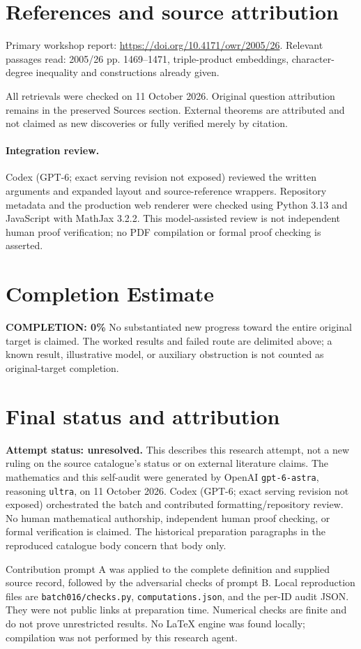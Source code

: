\documentclass[11pt]{article}
\begin{document}
\section{References and source attribution}
Primary workshop report: \url{https://doi.org/10.4171/owr/2005/26}. Relevant passages read: 2005/26 pp. 1469--1471, triple-product embeddings, character-degree inequality and constructions already given.

All retrievals were checked on 11 October 2026. Original question attribution remains in the preserved Sources section. External theorems are attributed and not claimed as new discoveries or fully verified merely by citation.


\paragraph{Integration review.} Codex (GPT-6; exact serving revision not exposed) reviewed the written arguments and expanded layout and source-reference wrappers. Repository metadata and the production web renderer were checked using Python 3.13 and JavaScript with MathJax 3.2.2. This model-assisted review is not independent human proof verification; no PDF compilation or formal proof checking is asserted.

\section{Completion Estimate}
\noindent\textbf{COMPLETION: 0\%}
No substantiated new progress toward the entire original target is claimed. The worked results and failed route are delimited above; a known result, illustrative model, or auxiliary obstruction is not counted as original-target completion.

\section{Final status and attribution}
\textbf{Attempt status: unresolved.} This describes this research attempt, not a new ruling on the source catalogue's status or on external literature claims.
The mathematics and this self-audit were generated by OpenAI \texttt{gpt-6-astra}, reasoning \texttt{ultra}, on 11 October 2026. Codex (GPT-6; exact serving revision not exposed) orchestrated the batch and contributed formatting/repository review. No human mathematical authorship, independent human proof checking, or formal verification is claimed. The historical preparation paragraphs in the reproduced catalogue body concern that body only.

Contribution prompt A was applied to the complete definition and supplied source record, followed by the adversarial checks of prompt B. Local reproduction files are \texttt{batch016/checks.py}, \texttt{computations.json}, and the per-ID audit JSON. They were not public links at preparation time. Numerical checks are finite and do not prove unrestricted results. No LaTeX engine was found locally; compilation was not performed by this research agent.
\end{document}
